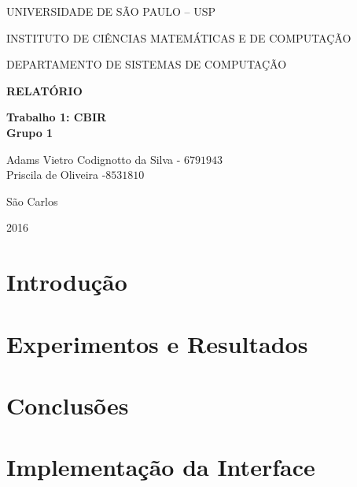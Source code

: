 \documentclass[10pt,a4paper]{article}
\newcommand*\NewPage{\newpage\null\thispagestyle{empty}\newpage}
\begin{document}
\thispagestyle{empty}
\begin{center}
	UNIVERSIDADE DE SÃO PAULO – USP
	
	INSTITUTO DE CIÊNCIAS MATEMÁTICAS E DE COMPUTAÇÃO
	
	DEPARTAMENTO DE SISTEMAS DE COMPUTAÇÃO
	
	\vspace{7cm}
	
	\Large{\textbf{RELATÓRIO}}
	 
	\Large{\textbf{Trabalho 1: CBIR}}\\
	\small{\textbf{Grupo 1}}
	
	\vspace{6cm}
	
	Adams Vietro Codignotto da Silva - $6791943$ \\ 
	Priscila de Oliveira -$8531810$\\
	
	
	\vspace{6cm}
	
	São Carlos
	
	2016
\end{center}

\NewPage
{}

\tableofcontents

\newpage
\section{Introdução}
\section{Experimentos e Resultados}
\section{Conclusões}
\section{Implementação da Interface}
\end{document}
